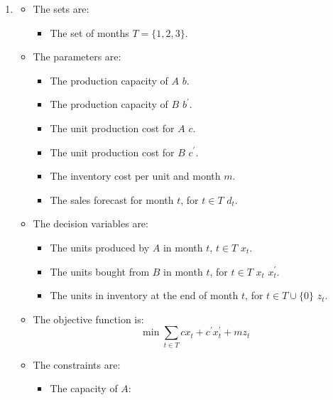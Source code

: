 \documentclass[12pt, a4paper]{report}
\newtheorem[style=M,bodystyle=\normalfont]{theorem}{Theorem}
\newtheorem[style=M,bodystyle=\normalfont]{corollary}{Corollary}
\newtheorem[style=M,bodystyle=\normalfont]{lemma}{Lemma}
\newtheorem[style=M,bodystyle=\normalfont]{definition}{Definition}
\begin{document}
    \begin{Answer}[ref=4]
        \begin{enumerate}
            \item \begin{itemize}
                    \item The sets are: 
                        \begin{itemize}
                            \item The set of months $T=\{1,2,3\}$. 
                        \end{itemize}
                    \item The parameters are: 
                        \begin{itemize}
                            \item The production capacity of $A$ $b$. 
                            \item The production capacity of $B$ $b^{'}$. 
                            \item The unit production cost for $A$ $c$. 
                            \item The unit production cost for $B$ $c^{'}$. 
                            \item The inventory cost per unit and month $m$. 
                            \item The sales forecast for month $t$, for $t \in T$ $d_t$. 
                        \end{itemize}
                    \item The decision variables are:
                        \begin{itemize}
                            \item The units produced by $A$ in month $t$, $t \in T$ $x_t$. 
                            \item The units bought from $B$ in month $t$, for $t \in T$ $x_t$ $x_t^{'}$.
                            \item The units in inventory at the end of month $t$, for $t \in T \cup \{0\}$ $z_t$. 
                        \end{itemize}
                    \item The objective function is: 
                        \[\min{\sum_{t \in T}{cx_t+c^{'}x_t^{'}+mz_t}}\]
                    \item The constraints are:
                        \begin{itemize}
                            \item The capacity of $A$: 

\end{itemize}
\end{itemize}
\end{enumerate}
\end{Answer}
\end{document}
